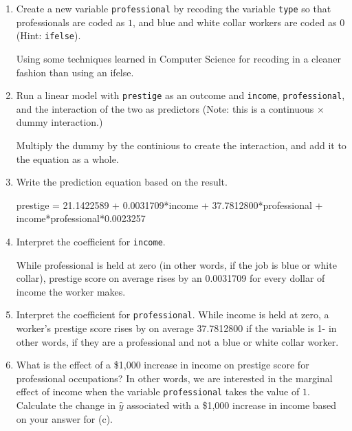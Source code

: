 \documentclass[12pt,letterpaper]{article}
\begin{document}
\newpage
\begin{enumerate}
	
	\item [(a)]
	Create a new variable \texttt{professional} by recoding the variable \texttt{type} so that professionals are coded as $1$, and blue and white collar workers are coded as $0$ (Hint: \texttt{ifelse}).
	
	Using some techniques learned in Computer Science for recoding in a cleaner fashion than using an ifelse.
	
		
	\vspace{6cm}
	
	
	\item [(b)]
	Run a linear model with \texttt{prestige} as an outcome and \texttt{income}, \texttt{professional}, and the interaction of the two as predictors (Note: this is a continuous $\times$ dummy interaction.)
	
		
		
		Multiply the dummy by the continious to create the interaction, and add it to the equation as a whole.
	
	\vspace{6cm}
	\item [(c)]
	Write the prediction equation based on the result.
	
	prestige = 21.1422589 + 0.0031709*income + 37.7812800*professional + income*professional*0.0023257
	
\newpage
	\item [(d)]
	Interpret the coefficient for \texttt{income}.
	
	While professional is held at zero (in other words, if the job is blue or white collar), prestige score on average rises by an 0.0031709 for every dollar of income the worker makes.
	
	\vspace{10cm}	
	\item [(e)]
	Interpret the coefficient for \texttt{professional}.
	While income is held at zero, a worker's prestige score rises by on average 37.7812800 if the variable is 1- in other words, if they are a professional and not a blue or white collar worker.
	
	\newpage
	\item [(f)]
	What is the effect of a \$1,000 increase in income on prestige score for professional occupations? In other words, we are interested in the marginal effect of income when the variable \texttt{professional} takes the value of $1$. Calculate the change in $\hat{y}$ associated with a \$1,000 increase in income based on your answer for (c).
	

\end{enumerate}
\end{document}
